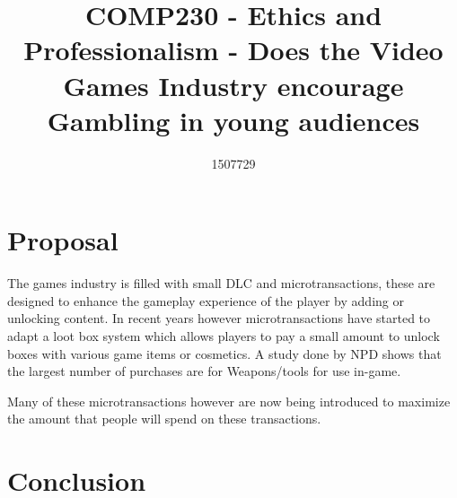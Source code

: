 \documentclass{scrartcl}
\title{COMP230 - Ethics and Professionalism - Does the Video Games Industry encourage Gambling in young audiences}
\author{1507729}
\begin{document}
\maketitle

\section{Proposal}
The games industry is filled with small DLC and microtransactions, these are designed to enhance the gameplay experience of the player by adding or unlocking content. In recent years however microtransactions have started to adapt a loot box system which allows players to pay a small amount to unlock boxes with various game items or cosmetics. A study done by NPD shows that the largest number of purchases are for Weapons/tools for use in-game. 

Many of these microtransactions however are now being introduced to maximize the amount that people will spend on these transactions. 


\section{Conclusion}





\end{document}
